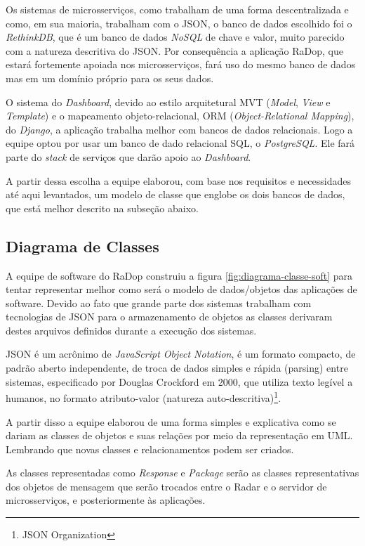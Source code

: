 Os sistemas de microsserviços, como trabalham de uma forma descentralizada e como, em sua maioria, trabalham com o JSON, o banco de dados escolhido foi o \textit{RethinkDB}, que é um banco de dados \textit{NoSQL} de chave e valor, muito parecido com a natureza descritiva do JSON. Por consequência a aplicação RaDop, que estará fortemente apoiada nos microsserviços, fará uso do mesmo banco de dados mas em um domínio próprio para os seus dados.

O sistema do \textit{Dashboard}, devido ao estilo arquitetural MVT (\textit{Model}, \textit{View} e \textit{Template}) e o mapeamento objeto-relacional, ORM (\textit{Object-Relational Mapping}), do \textit{Django}, a aplicação trabalha melhor com bancos de dados relacionais. Logo a equipe optou por usar um banco de dado relacional SQL, o \textit{PostgreSQL}. Ele fará parte do \textit{stack} de serviços que darão apoio ao \textit{Dashboard}.

A partir dessa escolha a equipe elaborou, com base nos requisitos e necessidades até aqui levantados, um modelo de classe que englobe os dois bancos de dados, que está melhor descrito na subseção abaixo.

\subsection{Diagrama de Classes}

A equipe de software do RaDop construiu a figura \ref{fig:diagrama-classe-soft} para tentar representar melhor como será o modelo de dados/objetos das aplicações de software. Devido ao fato que grande parte dos sistemas trabalham com tecnologias de JSON para o armazenamento de objetos as classes derivaram destes arquivos definidos durante a execução dos sistemas.

JSON é um acrônimo de \textit{JavaScript Object Notation}, é um formato compacto, de padrão aberto independente, de troca de dados simples e rápida (parsing) entre sistemas, especificado por Douglas Crockford em 2000, que utiliza texto legível a humanos, no formato atributo-valor (natureza auto-descritiva)\footnote{JSON Organization}.

A partir disso a equipe elaborou de uma forma simples e explicativa como se dariam as classes de objetos e suas relações por meio da representação em UML. Lembrando que novas classes e relacionamentos podem ser criados.

As classes representadas como \textit{Response} e \textit{Package} serão as classes representativas dos objetos de mensagem que serão trocados entre o Radar e o servidor de microsserviços, e posteriormente às aplicações.

